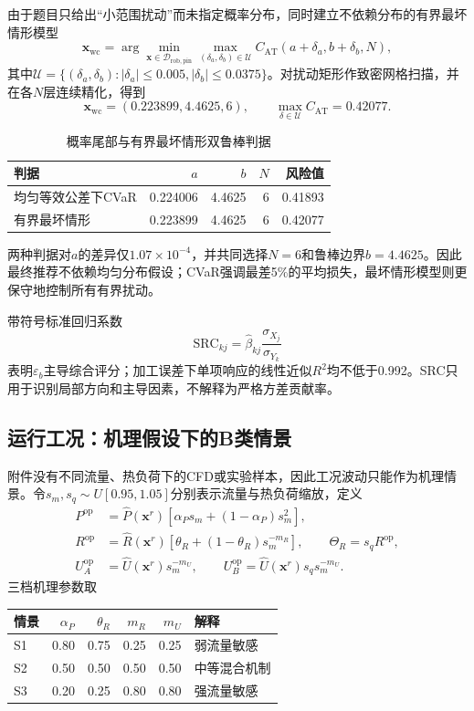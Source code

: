 \documentclass[UTF8,12pt,a4paper]{ctexart}
\begin{document}
由于题目只给出“小范围扰动”而未指定概率分布，同时建立不依赖分布的有界最坏情形模型
\begin{equation}
\bm x_{\mathrm{wc}}=
\arg\min_{\bm x\in\mathcal D_{\mathrm{rob,pin}}}
\max_{(\delta_a,\delta_b)\in\mathcal U}
C_{\mathrm{AT}}(a+\delta_a,b+\delta_b,N),
\end{equation}
其中$\mathcal U=\{(\delta_a,\delta_b):|\delta_a|\le0.005,
|\delta_b|\le0.0375\}$。对扰动矩形作致密网格扫描，并在各$N$层连续精化，得到
\begin{equation}
\bm x_{\mathrm{wc}}=(0.223899,4.4625,6),\qquad
\max_{\delta\in\mathcal U}C_{\mathrm{AT}}=0.42077.
\end{equation}

\begin{table}[H]\centering\small
\caption{概率尾部与有界最坏情形双鲁棒判据}
\begin{tabular}{lrrrr}
\toprule
判据&$a$&$b$&$N$&风险值\\\midrule
均匀等效公差下CVaR&0.224006&4.4625&6&0.41893\\
有界最坏情形&0.223899&4.4625&6&0.42077\\
\bottomrule
\end{tabular}
\end{table}
两种判据对$a$的差异仅$1.07\times10^{-4}$，并共同选择$N=6$和鲁棒边界$b=4.4625$。因此最终推荐不依赖均匀分布假设；CVaR强调最差5\%的平均损失，最坏情形模型则更保守地控制所有有界扰动。

带符号标准回归系数
\begin{equation}
\mathrm{SRC}_{kj}=\widehat\beta_{kj}\frac{\sigma_{X_j}}{\sigma_{Y_k}}
\end{equation}
表明$\varepsilon_b$主导综合评分；加工误差下单项响应的线性近似$R^2$均不低于0.992。SRC只用于识别局部方向和主导因素，不解释为严格方差贡献率。

\subsection{运行工况：机理假设下的B类情景}
附件没有不同流量、热负荷下的CFD或实验样本，因此工况波动只能作为机理情景。令$s_m,s_q\sim U[0.95,1.05]$分别表示流量与热负荷缩放，定义
\begin{align}
P^{\mathrm{op}}&=\widehat P(\bm x^r)[\alpha_Ps_m+(1-\alpha_P)s_m^2],\\
R^{\mathrm{op}}&=\widehat R(\bm x^r)[\theta_R+(1-\theta_R)s_m^{-m_R}],
\qquad\Theta_R=s_qR^{\mathrm{op}},\\
U_A^{\mathrm{op}}&=\widehat U(\bm x^r)s_m^{-m_U},\qquad
U_B^{\mathrm{op}}=\widehat U(\bm x^r)s_qs_m^{-m_U}.
\end{align}
三档机理参数取
\begin{center}
\begin{tabular}{lrrrrl}\toprule
情景&$\alpha_P$&$\theta_R$&$m_R$&$m_U$&解释\\\midrule
S1&0.80&0.75&0.25&0.25&弱流量敏感\\
S2&0.50&0.50&0.50&0.50&中等混合机制\\
S3&0.20&0.25&0.80&0.80&强流量敏感\\\bottomrule
\end{tabular}
\end{center}
\end{document}
